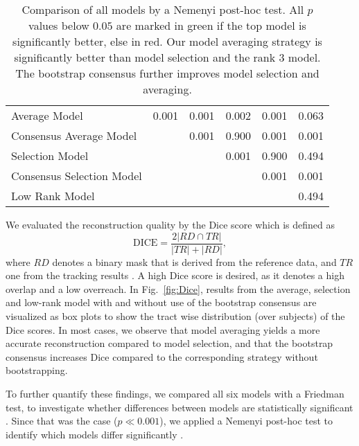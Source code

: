 \begin{table*}
\centering
\begin{tabular}{p{4cm}p{1.5cm}p{1cm}p{1cm}p{1cm}p{1cm}}
	{}  & \rot{Consensus   Average  Model} & \rot{Selection Model} &
	\rot{Consensus Selection Model} & \rot{Low Rank Model} & \rot{Consensus
	Low Rank Model} \\ \hline  
Average Model &   {\cellcolor{lightgreen} 0.001} & {\cellcolor{lightred} 0.001}
& {\cellcolor{lightgreen} 0.002} & {\cellcolor{lightred} 0.001} & 0.063 \\
Consensus Average Model &   & {\cellcolor{lightred} 0.001} & 0.900 &
{\cellcolor{lightred} 0.001} & {\cellcolor{lightred} 0.001} \\
Selection Model &    & & {\cellcolor{lightgreen} 0.001} & 0.900 & 0.494 \\
Consensus Selection Model &  &  &  & {\cellcolor{lightred} 0.001} &
{\cellcolor{lightred} 0.001} \\
Low Rank Model &   &
 &   & & 0.494 \\
\end{tabular}
\caption{Comparison of all models by a Nemenyi post-hoc test. All $p$ values
below $0.05$ are marked in green if the top model is significantly better, else
in red. Our model averaging strategy is significantly better than
model selection and the rank $3$ model. The bootstrap consensus further improves model selection and averaging.}
	\label{tab:sig}
\end{table*}

We
evaluated the reconstruction quality by the Dice score which is defined as
\[ 
	\text{DICE} = \frac{2 |RD \cap TR |}{|TR| + |RD|} ,
\]
where $RD$ denotes a binary mask that is derived from the reference data, and $TR$ one from the tracking results
\cite{SCHILLING2019194}. A high Dice score is desired, as it denotes a high
overlap and a low overreach. In Fig.~\ref{fig:Dice}, results from the average,
selection and low-rank model with and without use of the bootstrap consensus are
visualized as box plots to show the tract wise distribution (over subjects) of the Dice scores. In most cases, we observe that model averaging yields a more accurate reconstruction compared to model selection, and that the bootstrap consensus increases Dice compared to the corresponding strategy without bootstrapping.

To further quantify these findings, we compared all six models with a
Friedman test, to investigate whether differences between models are statistically significant \cite{doi:10.1080/01621459.1937.10503522}. Since that was the case ($p\ll 0.001$), we
applied a Nemenyi post-hoc test to identify which models differ significantly
\cite{Nemenyi}.

